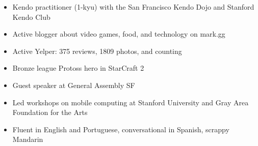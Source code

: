 

\begin{cvparagraph}

\begin{justify}

\begin{itemize}[leftmargin=2ex, nosep, noitemsep]
    \setlength{\parskip}{0pt}
    \renewcommand{\labelitemi}{\bullet}
    
\item Kendo practitioner (1-kyu) with the San Francisco Kendo Dojo and Stanford Kendo Club
\item Active blogger about video games, food, and technology on mark.gg
\item Active Yelper: 375 reviews, 1809 photos, and counting
\item Bronze league Protoss hero in StarCraft 2
\item Guest speaker at General Assembly SF
\item Led workshops on mobile computing at Stanford University and Gray Area Foundation for the Arts
\item Fluent in English and Portuguese, conversational in Spanish, scrappy Mandarin

\end{itemize}

\end{justify}

\end{cvparagraph}